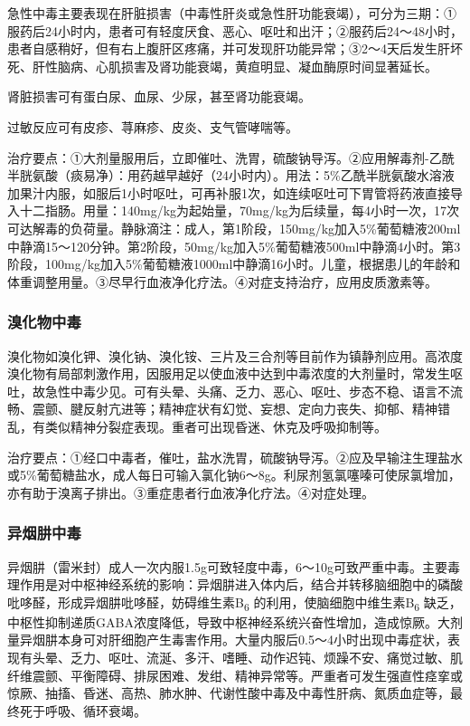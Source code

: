 急性中毒主要表现在肝脏损害（中毒性肝炎或急性肝功能衰竭），可分为三期：①服药后24小时内，患者可有轻度厌食、恶心、呕吐和出汗；②服药后24～48小时，患者自感稍好，但有右上腹肝区疼痛，并可发现肝功能异常；③2～4天后发生肝坏死、肝性脑病、心肌损害及肾功能衰竭，黄疸明显、凝血酶原时间显著延长。

肾脏损害可有蛋白尿、血尿、少尿，甚至肾功能衰竭。

过敏反应可有皮疹、荨麻疹、皮炎、支气管哮喘等。

治疗要点：①大剂量服用后，立即催吐、洗胃，硫酸钠导泻。②应用解毒剂-乙酰半胱氨酸（痰易净）：用药越早越好（24小时内）。用法：5\%乙酰半胱氨酸水溶液加果汁内服，如服后1小时呕吐，可再补服1次，如连续呕吐可下胃管将药液直接导入十二指肠。用量：140mg/kg为起始量，70mg/kg为后续量，每4小时一次，17次可达解毒的负荷量。静脉滴注：成人，第1阶段，150mg/kg加入5\%葡萄糖液200ml中静滴15～120分钟。第2阶段，50mg/kg加入5\%葡萄糖液500ml中静滴4小时。第3阶段，100mg/kg加入5\%葡萄糖液1000ml中静滴16小时。儿童，根据患儿的年龄和体重调整用量。③尽早行血液净化疗法。④对症支持治疗，应用皮质激素等。

\subsubsection{溴化物中毒}

溴化物如溴化钾、溴化钠、溴化铵、三片及三合剂等目前作为镇静剂应用。高浓度溴化物有局部刺激作用，因服用足以使血液中达到中毒浓度的大剂量时，常发生呕吐，故急性中毒少见。可有头晕、头痛、乏力、恶心、呕吐、步态不稳、语言不流畅、震颤、腱反射亢进等；精神症状有幻觉、妄想、定向力丧失、抑郁、精神错乱，有类似精神分裂症表现。重者可出现昏迷、休克及呼吸抑制等。

治疗要点：①经口中毒者，催吐，盐水洗胃，硫酸钠导泻。②应及早输注生理盐水或5\%葡萄糖盐水，成人每日可输入氯化钠6～8g。利尿剂氢氯噻嗪可使尿氯增加，亦有助于溴离子排出。③重症患者行血液净化疗法。④对症处理。

\subsubsection{异烟肼中毒}

异烟肼（雷米封）成人一次内服1.5g可致轻度中毒，6～10g可致严重中毒。主要毒理作用是对中枢神经系统的影响：异烟肼进入体内后，结合并转移脑细胞中的磷酸吡哆醛，形成异烟肼吡哆醛，妨碍维生素B\textsubscript{6}
的利用，使脑细胞中维生素B\textsubscript{6}
缺乏，中枢性抑制递质GABA浓度降低，导致中枢神经系统兴奋性增加，造成惊厥。大剂量异烟肼本身可对肝细胞产生毒害作用。大量内服后0.5～4小时出现中毒症状，表现有头晕、乏力、呕吐、流涎、多汗、嗜睡、动作迟钝、烦躁不安、痛觉过敏、肌纤维震颤、平衡障碍、排尿困难、发绀、精神异常等。严重者可发生强直性痉挛或惊厥、抽搐、昏迷、高热、肺水肿、代谢性酸中毒及中毒性肝病、氮质血症等，最终死于呼吸、循环衰竭。

